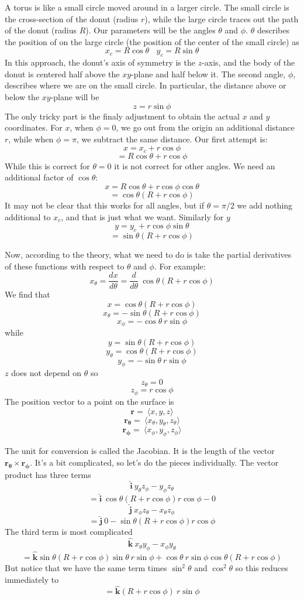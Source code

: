 \documentclass[11pt, oneside]{report}   	%
\begin{document}
A torus is like a small circle moved around in a larger circle.  The small circle is the cross-section of the donut (radius $r$), while the large circle traces out the path of the donut (radius $R$).  Our parameters will be the angles $\theta$ and $\phi$.  $\theta$ describes the position of on the large circle (the position of the center of the small circle) as 
\[ x_c = R \cos \theta \ \ \ \  y_c = R \sin \theta \]
In this approach, the donut's axis of symmetry is the $z$-axis, and the body of the donut is centered half above the $xy$-plane and half below it.  The second angle, $\phi$, describes where we are on the small circle.  In particular, the distance above or below the $xy$-plane will be
\[ z = r \sin \phi \]
The only tricky part is the finaly adjustment to obtain the actual $x$ and $y$ coordinates.  For $x$, when $\phi = 0$, we go out from the origin an additional distance $r$, while when $\phi = \pi$, we subtract the same distance.  Our first attempt is:
\[ x = x_c + r \cos \phi \]
\[ = R \cos \theta + r \cos \phi \]
While this is correct for $\theta = 0$ it is not correct for other angles.  We need an additional factor of
$\cos \theta$:
\[ x = R \cos \theta + r \cos \phi \cos \theta \]
\[ = \cos \theta (R + r \cos \phi) \]
It may not be clear that this works for all angles, but if $\theta = \pi/2$ we add nothing additional to $x_c$, and that is just what we want.  Similarly for $y$
\[ y = y_c + r \cos \phi \sin \theta \]
\[ = \sin \theta (R  + r \cos \phi) \]

Now, according to the theory, what we need to do is take the partial derivatives of these functions with respect to $\theta$ and $\phi$.  For example:
\[ x_{\theta} = \frac{dx}{d \theta} = \frac{d}{d \theta} \ \cos \theta (R + r \cos \phi) \]
We find that
\[ x = \cos \theta (R + r \cos \phi) \]
\[ x_{\theta} = -\sin \theta (R + r \cos \phi) \]
\[ x_{\phi} = -\cos \theta \ r \sin \phi \]
while
\[ y = \sin \theta (R  + r \cos \phi) \]
\[ y_{\theta} = \cos \theta (R + r \cos \phi) \]
\[ y_{\phi} = -\sin \theta \ r \sin \phi \]
$z$ does not depend on $\theta$ so
\[ z_{\theta} = 0 \]
\[ z_{\phi} = r \cos \phi \]
The position vector to a point on the surface is
\[ \mathbf{r} = \ \langle x,y,z \rangle \]
\[ \mathbf{r_{\theta}} = \ \langle x_{\theta},y_{\theta},z_{\theta} \rangle \]
\[ \mathbf{r_{\phi}} = \ \langle x_{\phi},y_{\phi},z_{\phi} \rangle \]

The unit for conversion is called the Jacobian.  It is the length of the vector $\mathbf{r_{\theta}} \times \mathbf{r_{\phi}}$.  It's a bit complicated, so let's do the pieces individually.  The vector product has three terms
\[ \hat{\mathbf{i}} \ y_{\theta} z_{\phi} -  y_{\phi} z_{\theta} \]
\[ = \hat{\mathbf{i}} \  \cos \theta (R + r \cos \phi) r \cos \phi - 0 \]
\[ \hat{\mathbf{j}} \ x_{\phi} z_{\theta} -  x_{\theta} z_{\phi} \]
\[ = \hat{\mathbf{j}} \  0 - \sin \theta (R + r \cos \phi) r \cos \phi  \]
The third term is most complicated
\[ \hat{\mathbf{k}} \ x_{\theta} y_{\phi} -  x_{\phi} y_{\theta} \]
\[ = \hat{\mathbf{k}} \sin \theta (R + r \cos \phi) \sin \theta \ r \sin \phi + \cos \theta \ r \sin \phi \cos \theta (R + r \cos \phi) \]
But notice that we have the same term times $\sin^2 \theta$ and $\cos^2 \theta$ so this reduces immediately to 
\[ = \hat{\mathbf{k}}  (R + r \cos \phi) \ r \sin \phi \]
\end{document}
